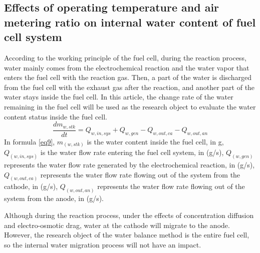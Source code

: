 

\subsection{Effects of operating temperature and air metering ratio on internal water content of fuel cell system}
According to the working principle of the fuel cell, during the reaction process, water mainly comes from the electrochemical reaction and the water vapor that enters the fuel cell with the reaction gas. Then, a part of the water is discharged from the fuel cell with the exhaust gas after the reaction, and another part of the water stays inside the fuel cell. In this article, the change rate of the water remaining in the fuel cell will be used as the research object to evaluate the water content status inside the fuel cell.
\begin{equation}
	\label{eq9}
	{\frac{d m_{w,s t k}}{d t}}=Q_{w,i n,s y s}+Q_{w,g e n}-Q_{w,o u t,c a}-Q_{w,o u t,a n}
\end{equation}
In formula \ref{eq9}, $m_(w,stk)$ is the water content inside the fuel cell, in g, $Q_(w,in,sys)$ is the water flow rate entering the fuel cell system, in (g/s), $Q_(w,gen)$ represents the water flow rate generated by the electrochemical reaction, in (g/s), $Q_(w,out,ca)$ represents the water flow rate flowing out of the system from the cathode, in (g/s), $Q_(w,out,an)$ represents the water flow rate flowing out of the system from the anode, in (g/s).
\par
Although during the reaction process, under the effects of concentration diffusion and electro-osmotic drag, water at the cathode will migrate to the anode. However, the research object of the water balance method is the entire fuel cell, so the internal water migration process will not have an impact.

